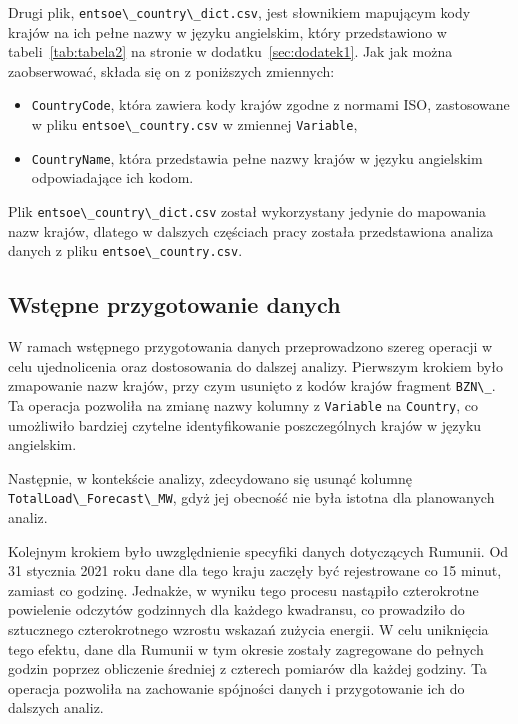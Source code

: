 \documentclass[polish, twoside, 12pt, a4paper]{article}
\theoremstyle{definition}
\theoremstyle{plain}
\theoremstyle{remark}
\newcommand{\code}[1]{\lstinline{#1}}
\begin{document}
Drugi plik, \code{entsoe\_country\_dict.csv}, jest słownikiem mapującym kody krajów na ich pełne nazwy w języku angielskim, który przedstawiono  w tabeli~\ref{tab:tabela2} na stronie \pageref{tab:tabela2} w dodatku~\ref{sec:dodatek1}. Jak jak można zaobserwować, składa się on z poniższych zmiennych:
\begin{itemize}
    \item \code{CountryCode}, która zawiera kody krajów zgodne z normami ISO, zastosowane w pliku \code{entsoe\_country.csv} w zmiennej \code{Variable},
    \item \code{CountryName}, która przedstawia pełne nazwy krajów w języku angielskim odpowiadające ich kodom.
\end{itemize}

Plik \code{entsoe\_country\_dict.csv} został wykorzystany jedynie do mapowania nazw krajów, dlatego w dalszych częściach pracy została przedstawiona analiza danych z pliku \code{entsoe\_country.csv}.

\subsection{Wstępne przygotowanie danych}\label{przygotowanie-danych}

W ramach wstępnego przygotowania danych przeprowadzono szereg operacji w celu ujednolicenia oraz dostosowania do dalszej analizy. 
Pierwszym krokiem było zmapowanie nazw krajów, przy czym usunięto z kodów krajów fragment \code{BZN\_}. Ta operacja pozwoliła na zmianę nazwy kolumny z \code{Variable} na \code{Country}, co umożliwiło bardziej czytelne identyfikowanie poszczególnych krajów w języku angielskim.

Następnie, w kontekście analizy, zdecydowano się usunąć kolumnę \code{TotalLoad\_Forecast\_MW}, gdyż jej obecność nie była istotna dla planowanych analiz.

Kolejnym krokiem było uwzględnienie specyfiki danych dotyczących Rumunii. Od 31 stycznia 2021 roku dane dla tego kraju zaczęły być rejestrowane co 15 minut, zamiast co godzinę. Jednakże, w wyniku tego procesu nastąpiło czterokrotne powielenie odczytów godzinnych dla każdego kwadransu, co prowadziło do sztucznego czterokrotnego wzrostu wskazań zużycia energii. W celu uniknięcia tego efektu, dane dla Rumunii w tym okresie zostały zagregowane do pełnych godzin poprzez obliczenie średniej z czterech pomiarów dla każdej godziny. Ta operacja pozwoliła na zachowanie spójności danych i przygotowanie ich do dalszych analiz.
\end{document}
